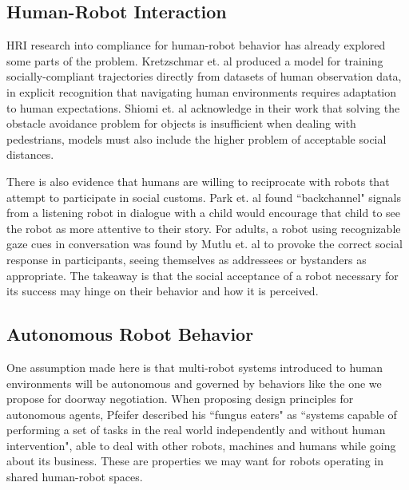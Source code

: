 \documentclass[letterpaper, 10 pt, conference]{ieeeconf}  %
\begin{document}
\subsection{Human-Robot Interaction}

HRI research into compliance for human-robot behavior has already explored some parts of the problem. Kretzschmar et. al\cite{c6} produced a model for training socially-compliant trajectories directly from datasets of human observation data, in explicit recognition that navigating human environments requires adaptation to human expectations. Shiomi et. al\cite{c7} acknowledge in their work that solving the obstacle avoidance problem for objects is insufficient when dealing with pedestrians, models must also include the higher problem of acceptable social distances. 

There is also evidence that humans are willing to reciprocate with robots that attempt to participate in social customs. Park et. al\cite{c8} found ``backchannel" signals from a listening robot in dialogue with a child would encourage that child to see the robot as more attentive to their story. For adults, a robot using recognizable gaze cues in conversation was found by Mutlu et. al\cite{c9} to provoke the correct social response in participants, seeing themselves as addressees or bystanders as appropriate. The takeaway is that the social acceptance of a robot necessary for its success may hinge on their behavior and how it is perceived.


\subsection{Autonomous Robot Behavior}

One assumption made here is that multi-robot systems introduced to human environments will be autonomous and governed by behaviors like the one we propose for doorway negotiation. When proposing design principles for autonomous agents\cite{c10}, Pfeifer described his ``fungus eaters" as ``systems capable of performing a set of tasks in the real world independently and without human intervention", able to deal with other robots, machines and humans while going about its business. These are properties we may want for robots operating in shared human-robot spaces.

\end{document}

